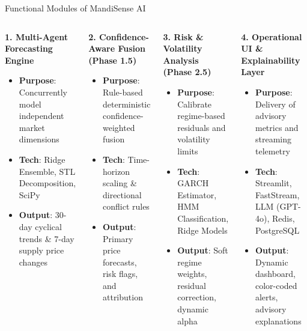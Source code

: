 \documentclass{beamer}
\begin{document}
\begin{frame}{Functional Modules of MandiSense AI}
\begin{columns}[T]
\begin{smallcard}[0.98\textwidth]
    \textbf{\textcolor{primaryDark}{1. Multi-Agent Forecasting Engine}}
    \begin{itemize}
        \scriptsize
        \item \textbf{Purpose}: Concurrently model independent market dimensions
        \item \textbf{Tech}: Ridge Ensemble, STL Decomposition, SciPy
        \item \textbf{Output}: 30-day cyclical trends \& 7-day supply price changes
    \end{itemize}
\end{smallcard}
\vspace{0.1cm}
\begin{smallcard}[0.98\textwidth]
    \textbf{\textcolor{primaryDark}{2. Confidence-Aware Fusion (Phase 1.5)}}
    \begin{itemize}
        \scriptsize
        \item \textbf{Purpose}: Rule-based deterministic confidence-weighted fusion
        \item \textbf{Tech}: Time-horizon scaling \& directional conflict rules
        \item \textbf{Output}: Primary price forecasts, risk flags, and attribution
    \end{itemize}
\end{smallcard}

\begin{smallcard}[0.98\textwidth]
    \textbf{\textcolor{primaryDark}{3. Risk \& Volatility Analysis (Phase 2.5)}}
    \begin{itemize}
        \scriptsize
        \item \textbf{Purpose}: Calibrate regime-based residuals and volatility limits
        \item \textbf{Tech}: GARCH Estimator, HMM Classification, Ridge Models
        \item \textbf{Output}: Soft regime weights, residual correction, dynamic alpha
    \end{itemize}
\end{smallcard}
\vspace{0.1cm}
\begin{smallcard}[0.98\textwidth]
    \textbf{\textcolor{primaryDark}{4. Operational UI \& Explainability Layer}}
    \begin{itemize}
        \scriptsize
        \item \textbf{Purpose}: Delivery of advisory metrics and streaming telemetry
        \item \textbf{Tech}: Streamlit, FastStream, LLM (GPT-4o), Redis, PostgreSQL
        \item \textbf{Output}: Dynamic dashboard, color-coded alerts, advisory explanations
    \end{itemize}
\end{smallcard}
\end{columns}
\end{frame}
\end{document}
